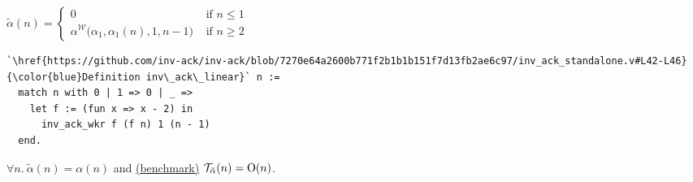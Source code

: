 %
\begin{defn} \label{defn: inv-ack-hardcode}
	$\tilde{\alpha}(n) = \begin{cases}
	0 & \text{ if } n \le 1 \\ \alpha^{\mathcal{W}}\big(\alpha_1, \alpha_1(n), 1, n-1\big) & \text{ if } n \ge 2
	\end{cases}$
\end{defn}

\begin{lstlisting}
`\href{https://github.com/inv-ack/inv-ack/blob/7270e64a2600b771f2b1b1b151f7d13fb2ae6c97/inv_ack_standalone.v#L42-L46}{\color{blue}Definition inv\_ack\_linear}` n :=
  match n with 0 | 1 => 0 | _ => 
    let f := (fun x => x - 2) in
      inv_ack_wkr f (f n) 1 (n - 1)
  end.
\end{lstlisting}

\begin{thm} \label{thm: inv-ack-hardcode-correct}
	\href{https://github.com/inv-ack/inv-ack/blob/7270e64a2600b771f2b1b1b151f7d13fb2ae6c97/inv_ack.v#L329-L337}{\color{blue}\coq}
	$\forall n.~\tilde{\alpha}(n) = \alpha(n)$
	\; and \hfill\break 
	\href{https://github.com/inv-ack/inv-ack/blob/7270e64a2600b771f2b1b1b151f7d13fb2ae6c97/inv_ack_test.v#L5-L10}{\hspace{6.1em}\color{blue}\coq (benchmark)}
	$\mathcal{T}_{\tilde{\alpha}}(n) = \text{O}(n)$.
\end{thm}

